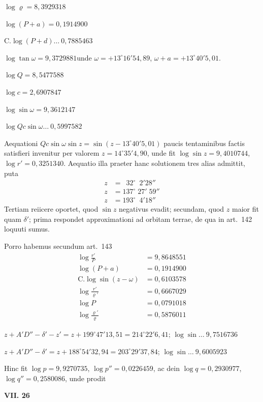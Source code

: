 \documentclass[12pt,a4paper]{article}
\begin{document}
$\log\varrho = 8,3929318$

$\log(P + a) = 0,1914900$

C.$\log(P + d) \ldots\ 0,7885463$

$\log\tan\omega = 9,3729881$\quad unde $\omega = +13^\circ16'54,89$, $\omega + a = +13^\circ40'5,01$.

$\log Q = 8,5477588$

$\log c = 2,6907847$

$\log\sin\omega = 9,3612147$

$\log Qc\sin\omega \ldots\ 0,5997582$

Aequationi $Qc\sin\omega \sin z = \sin(z - 13^\circ40'5,01)$ paucis tentaminibus factis satisfieri invenitur per valorem $z = 14^\circ35'4,90$, unde fit $\log\sin z = 9,4010744$, $\log r' = 0,3251340$. Aequatio illa praeter hanc solutionem tres alias admittit, puta
\begin{align*}
z &= \phantom{0}32^\circ\phantom{0}2'28''\\
z &= 137^\circ\;27'\;59''\\
z &= 193^\circ\phantom{0}4'18''
\end{align*}
Tertiam reiicere oportet, quod $\sin z$ negativus evadit; secundam, quod $z$ maior fit quam $\delta'$; prima respondet approximationi ad orbitam terrae, de qua in art.~142 loquuti sumus.

Porro habemus secundum art.~143
\begin{align*}
\log\tfrac{r'}{P} &= 9,8648551\\
\log(P + a) &= 0,1914900\\
\text{C.}\log\sin(z - \omega) &= 0,6103578\\
\hline
\log\tfrac{r'}{\varrho'} &= 0,6667029\\
\log P &= 0,0791018\\
\log\tfrac{\varrho'}{\varrho} &= 0,5876011
\end{align*}

$z + A'D'' - \delta' - z' = z + 199^\circ47'13,51 = 214^\circ22'6,41$; $\log\sin \ldots\ 9,7516736$

$z + A'D'' - \delta' = z + 188^\circ54'32,94 = 203^\circ29'37,84$; $\log\sin \ldots\ 9,6005923$

Hinc fit $\log p = 9,9270735$, $\log p'' = 0,0226459$, ac dein $\log q = 0,2930977$, $\log q'' = 0,2580086$, unde prodit

\begin{center}
\textbf{VII. 26}
\end{center}
\end{document}
